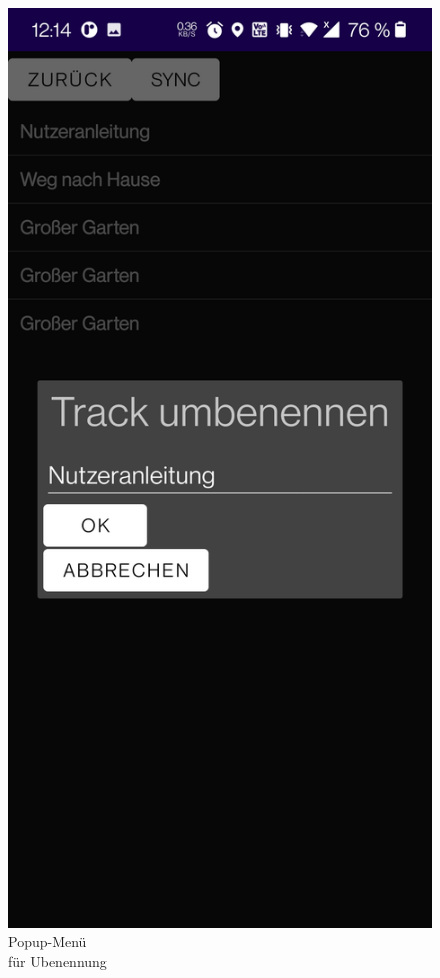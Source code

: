 \documentclass{article}
\begin{document}
\begin{figure}[H]
		\endminipage\hfill
		  \includegraphics[scale=0.15]{12_umbenennen2.jpg}
		  \centering
		  \caption{Popup-Menü \\für Ubenennung}
		\endminipage\hfill
	\end{figure}
	\newpage
\end{document}
